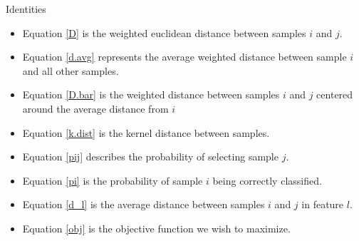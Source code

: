 \documentclass[12pt, a4paper]{article}
\begin{document}
\begin{section}{Identities}
    \begin{itemize}
        \item Equation \ref{D} is the weighted euclidean distance between
            samples $i$ and $j$.
        \item Equation \ref{d.avg} represents the average weighted
            distance between sample $i$ and all other samples.
        \item Equation \ref{D.bar} is the weighted distance between samples $i$
            and $j$ centered around the average distance from $i$
        \item Equation \ref{k.dist} is the kernel distance between samples.
        \item Equation \ref{pij} describes the probability of selecting
            sample $j$.
        \item Equation \ref{pi} is the probability of sample $i$ being correctly
            classified.
        \item Equation \ref{d_l} is the average distance between samples $i$
            and $j$ in feature $l$.
        \item Equation \ref{obj} is the objective function we wish to
            maximize.
    \end{itemize}
 
\end{section}
\end{document}
